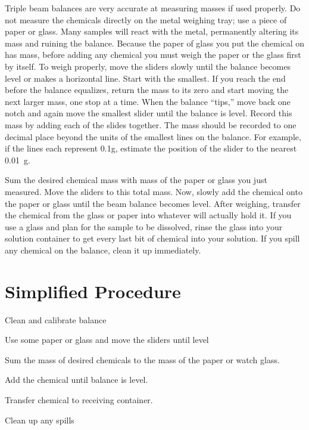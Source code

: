 Triple beam balances are very accurate at measuring masses if used properly. Do not measure the chemicals directly on the metal weighing tray; use a piece of paper or glass. Many samples will react with the metal, permanently altering its mass and ruining the balance. Because the paper of glass you put the chemical on has mass, before adding any chemical you must weigh the paper or the glass first by itself. To weigh properly, move the sliders slowly until the balance becomes level or makes a horizontal line. Start with the smallest. If you reach the end before the balance equalizes, return the mass to its zero and start moving the next larger mass, one stop at a time. When the balance “tips,” move back one notch and again move the smallest slider until the balance is level. Record this mass by adding each of the slides together. The mass should be recorded to one decimal place beyond the units of the smallest lines on the balance. For example, if the lines each represent 0.1g, estimate the position of the slider to the nearest 0.01~g.

Sum the desired chemical mass with mass of the paper or glass you just measured. Move the sliders to this total mass. Now, slowly add the chemical onto the paper or glass until the beam balance becomes level. After weighing, transfer the chemical from the glass or paper into whatever will actually hold it. If you use a glass and plan for the sample to be dissolved, rinse the glass into your solution container to get every last bit of chemical into your solution. If you spill any chemical on the balance, clean it up immediately.

\section{Simplified Procedure}

\begin{itemize*}

\item{Clean and calibrate balance}
\item{Use some paper or glass and move the sliders until level}
\item{Sum the mass of desired chemicals to the mass of the paper or watch glass.}
\item{Add the chemical until balance is level.}
\item{Transfer chemical to receiving container.}
\item{Clean up any spills}

\end{itemize*}

